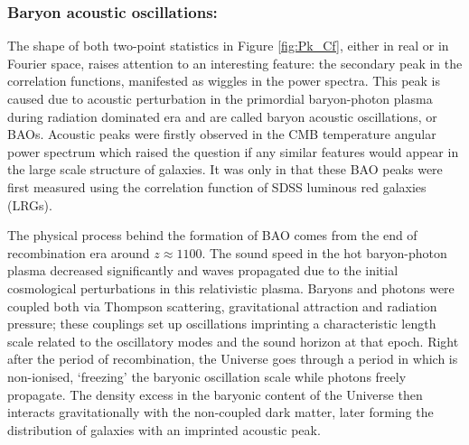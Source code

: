\subsubsection{Baryon acoustic oscillations:}
The shape of both two-point statistics in Figure \ref{fig:Pk_Cf}, either in real or in Fourier space, raises attention to an interesting feature: the secondary peak in the correlation functions, manifested as wiggles in the power spectra. This peak is caused due to acoustic perturbation in the primordial baryon-photon plasma during radiation dominated era and are called baryon acoustic oscillations, or BAOs. Acoustic peaks were firstly observed in the CMB temperature angular power spectrum which raised the question if any similar features would appear in the large scale structure of galaxies. It was only in \cite{Einsenstein2005} that these BAO peaks were first measured using the correlation function of SDSS luminous red galaxies (LRGs).

\qquad The physical process behind the formation of BAO comes from the end of recombination era around $z \approx 1100$. The sound speed in the hot baryon-photon plasma decreased significantly and waves propagated due to the initial cosmological perturbations in this relativistic plasma. Baryons and photons were coupled both via Thompson scattering, gravitational attraction and radiation pressure; these couplings set up oscillations imprinting a characteristic length scale related to the oscillatory modes and the sound horizon at that epoch. Right after the period of recombination, the Universe goes through a period in which is non-ionised, `freezing' the baryonic oscillation scale while photons freely propagate. The density excess in the baryonic content of the Universe then interacts gravitationally with the non-coupled dark matter, later forming the distribution of galaxies with an imprinted acoustic peak.

